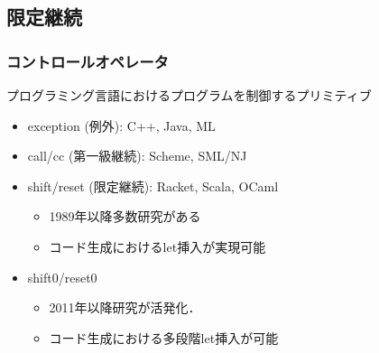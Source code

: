 \documentclass[dvipdfmx,cjk,xcolor=dvipsnames,envcountsect,notheorems,12pt]{beamer}
\newcommand\cResetz{\underline{\textbf{reset0}}}
\newcommand\cShiftz{\underline{\textbf{shift0}}}
\theoremstyle{definition}
\begin{document}
\subsection{限定継続}

\begin{frame}
  \frametitle{コントロールオペレータ}
  \begin{block}{プログラミング言語におけるプログラムを制御するプリミティブ}
    \begin{itemize}
    \item exception (例外): C++, Java, ML
    \item call/cc (第一級継続): Scheme, SML/NJ
    \item shift/reset (限定継続): Racket, Scala, OCaml
      \begin{itemize}
      \item 1989年以降多数研究がある
      \item コード生成におけるlet挿入が実現可能
      \end{itemize}
    \item \alert{shift0/reset0}
      \begin{itemize}
      \item 2011年以降研究が活発化．
      \item コード生成における\alert{多段階let挿入}が可能
      \end{itemize}
    \end{itemize}
  \end{block}
\end{frame}



\end{document}
